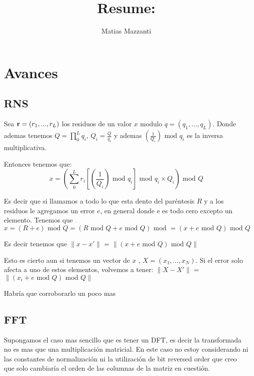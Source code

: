 \documentclass[12pt, oneside]{article}
\title{Resume: }
\author{Matias Mazzanti}
\date{}
\begin{document}
\maketitle
\tableofcontents

\section{Avances}

\subsection{RNS}

Sea $\bold{r} = (r_1, ..., r_L)$ los residuos de un valor $x$ modulo $q = (q_1, ...,q_L)$.
Donde ademas tenemos $Q = \prod_0^L q_i$, $Q_i = \frac{Q}{q_i}$ y ademas $\left(\frac{1}{Q_{i}}\right)\text{ mod } q_i$ es la inversa multiplicativa.

Entonces tenemos que:
\begin{equation}
    x = \left(\sum_0^L r_i\left[\left(\frac{1}{Q_{i}}\right)\text{ mod } q_i\right]\text{ mod } q_i \times Q_i\right) \text{ mod } Q
\end{equation}

Es decir que si llamamos a todo lo que esta dento del paréntesis $R$ y a los residuos le agregamos un error $e$, en general donde e es todo cero excepto un elemento.
Tenemos que
\begin{equation}
    x = \left(R + e \right) \text{ mod } Q = \left(R \text{ mod } Q + e \text{ mod } Q \right) \text{ mod } = \left( x + e \text{ mod } Q \right) \text{ mod } Q
\end{equation}

Es decir tenemos que
$\lVert x - x' \rVert$ = $\lVert (x + e \text{ mod } Q ) \text{ mod }Q \rVert$

Esto es cierto aun si tenemos un vector de $x$ , $X = (x_1, ...,x_N)$.
Si el error solo afecta a uno de estos elementos, volvemos a tener:
$\lVert X - X' \rVert$ = $\lVert (x_i + e \text{ mod } Q ) \text{ mod }Q \rVert$

Habría que corroborarlo un poco mas


\subsection{FFT}

Supongamos el caso mas sencillo que es tener un DFT, es decir la transformada no es mas que una
multiplicación matricial.
En este caso no estoy considerando ni las constantes de normalización ni la utilización de bit reversed order que
creo que solo cambiaría el orden de las columnas de la matriz en cuestión.
\end{document}
